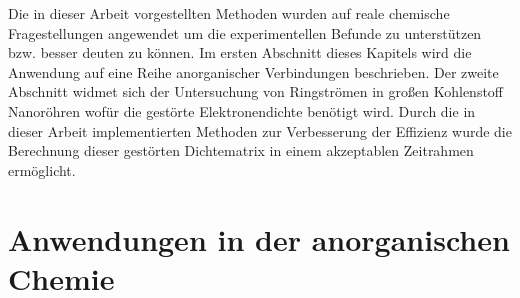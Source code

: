 Die in dieser Arbeit vorgestellten Methoden wurden auf reale chemische Fragestellungen angewendet um die experimentellen Befunde zu unterstützen bzw. besser deuten zu können.
Im ersten Abschnitt dieses Kapitels wird die Anwendung auf eine Reihe anorganischer Verbindungen beschrieben. Der zweite Abschnitt widmet sich der Untersuchung von Ringströmen in großen Kohlenstoff Nanoröhren wofür die gestörte Elektronendichte benötigt wird. Durch die in dieser Arbeit implementierten Methoden zur Verbesserung der Effizienz wurde die Berechnung dieser gestörten Dichtematrix in einem akzeptablen Zeitrahmen ermöglicht. 

\section{Anwendungen in der anorganischen Chemie}
\FloatBarrier
